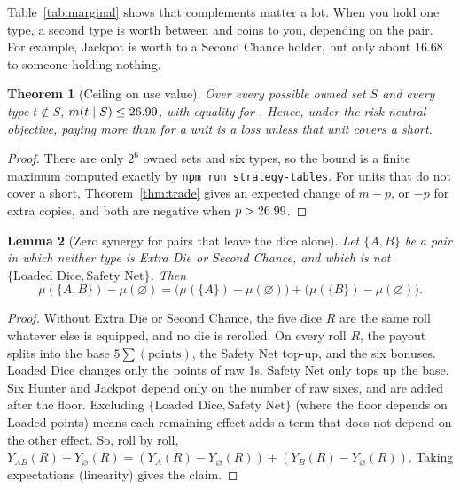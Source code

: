 \documentclass[11pt]{article}
\newtheorem{theorem}{Theorem}
\newtheorem{lemma}[theorem]{Lemma}
\theoremstyle{definition}
\begin{document}
\begin{table}[ht]\centering\small
\TableMarginal
\caption{Marginal value $m(B\mid\{A\})$ of acquiring the column type while holding exactly the row type. The first row holds nothing. Abbreviations as in Table~\ref{tab:triples}.}\label{tab:marginal}
\end{table}

Table~\ref{tab:marginal} shows that complements matter a lot. When you hold one type, a second type is worth between \MinMarginal{} and \MaxMarginal{} coins to you, depending on the pair. For example, Jackpot is worth \MaxMarginal{} to a Second Chance holder, but only about 16.68 to someone holding nothing.

\begin{theorem}[Ceiling on use value]\label{thm:ceiling}
Over every possible owned set $S$ and every type $t \notin S$, $m(t\mid S) \le 26.99$, with equality for \MaxMarginalAllWhere. Hence, under the risk-neutral objective, paying more than \MaxMarginalAll{} for a unit is a loss \emph{unless that unit covers a short}.
\end{theorem}
\begin{proof}
There are only $2^6$ owned sets and six types, so the bound is a finite maximum computed exactly by \texttt{npm run strategy-tables}. For units that do not cover a short, Theorem~\ref{thm:trade} gives an expected change of $m - p$, or $-p$ for extra copies, and both are negative when $p > 26.99$.
\end{proof}

\begin{lemma}[Zero synergy for pairs that leave the dice alone]\label{lem:additive}
Let $\{A,B\}$ be a pair in which neither type is Extra Die or Second Chance, and which is not $\{\text{Loaded Dice}, \text{Safety Net}\}$. Then
\[
  \mu(\{A,B\}) - \mu(\varnothing) = \bigl(\mu(\{A\}) - \mu(\varnothing)\bigr) + \bigl(\mu(\{B\}) - \mu(\varnothing)\bigr).
\]
\end{lemma}
\begin{proof}
Without Extra Die or Second Chance, the five dice $R$ are the same roll whatever else is equipped, and no die is rerolled. On every roll $R$, the payout splits into the base $5\sum(\text{points})$, the Safety Net top-up, and the six bonuses. Loaded Dice changes only the points of raw 1s. Safety Net only tops up the base. Six Hunter and Jackpot depend only on the number of raw sixes, and are added after the floor. Excluding $\{\text{Loaded Dice}, \text{Safety Net}\}$ (where the floor depends on Loaded points) means each remaining effect adds a term that does not depend on the other effect. So, roll by roll, $Y_{AB}(R) - Y_\varnothing(R) = (Y_A(R) - Y_\varnothing(R)) + (Y_B(R) - Y_\varnothing(R))$. Taking expectations (linearity) gives the claim.
\end{proof}
\end{document}
